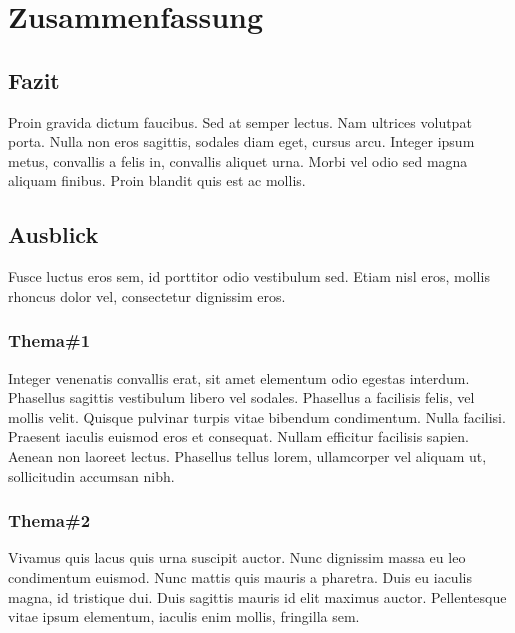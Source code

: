 \chapter{Zusammenfassung}

\section{Fazit}

Proin gravida dictum faucibus. Sed at semper lectus. Nam ultrices volutpat porta. Nulla non eros sagittis, sodales diam eget, cursus arcu. Integer ipsum metus, convallis a felis in, convallis aliquet urna. Morbi vel odio sed magna aliquam finibus. Proin blandit quis est ac mollis.\cite{join_study}

\section{Ausblick}

Fusce luctus eros sem, id porttitor odio vestibulum sed. Etiam nisl eros, mollis rhoncus dolor vel, consectetur dignissim eros. 

\subsection{Thema\#1}

Integer venenatis convallis erat, sit amet elementum odio egestas interdum. Phasellus sagittis vestibulum libero vel sodales. Phasellus a facilisis felis, vel mollis velit. Quisque pulvinar turpis vitae bibendum condimentum. Nulla facilisi. Praesent iaculis euismod eros et consequat. Nullam efficitur facilisis sapien. Aenean non laoreet lectus. Phasellus tellus lorem, ullamcorper vel aliquam ut, sollicitudin accumsan nibh. 

\subsection{Thema\#2}

Vivamus quis lacus quis urna suscipit auctor. Nunc dignissim massa eu leo condimentum euismod. Nunc mattis quis mauris a pharetra. Duis eu iaculis magna, id tristique dui. Duis sagittis mauris id elit maximus auctor. Pellentesque vitae ipsum elementum, iaculis enim mollis, fringilla sem. 

